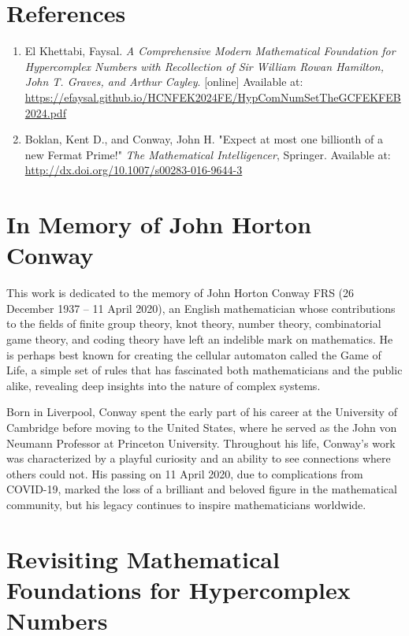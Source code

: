 \documentclass[12pt]{article}
\begin{document}
\section*{References}

\begin{enumerate}
    \item El Khettabi, Faysal. \textit{A Comprehensive Modern Mathematical Foundation for Hypercomplex Numbers with Recollection of Sir William Rowan Hamilton, John T. Graves, and Arthur Cayley}. [online] Available at: \url{https://efaysal.github.io/HCNFEK2024FE/HypComNumSetTheGCFEKFEB2024.pdf}
    \item Boklan, Kent D., and Conway, John H. "Expect at most one billionth of a new Fermat Prime!" \textit{The Mathematical Intelligencer}, Springer. Available at: \url{http://dx.doi.org/10.1007/s00283-016-9644-3}
\end{enumerate}

\section*{In Memory of John Horton Conway}

This work is dedicated to the memory of John Horton Conway FRS (26 December 1937 – 11 April 2020), an English mathematician whose contributions to the fields of finite group theory, knot theory, number theory, combinatorial game theory, and coding theory have left an indelible mark on mathematics. He is perhaps best known for creating the cellular automaton called the Game of Life, a simple set of rules that has fascinated both mathematicians and the public alike, revealing deep insights into the nature of complex systems.

Born in Liverpool, Conway spent the early part of his career at the University of Cambridge before moving to the United States, where he served as the John von Neumann Professor at Princeton University. Throughout his life, Conway's work was characterized by a playful curiosity and an ability to see connections where others could not. His passing on 11 April 2020, due to complications from COVID-19, marked the loss of a brilliant and beloved figure in the mathematical community, but his legacy continues to inspire mathematicians worldwide.

\appendix



\section{Revisiting Mathematical Foundations for Hypercomplex Numbers}
\end{document}
